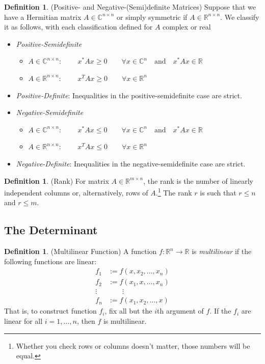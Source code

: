 \documentclass[12pt]{article}
\theoremstyle{plain}
\theoremstyle{definition}
\newtheorem{defn}[thm]{Definition}
\theoremstyle{remark}
\newcommand{\R}{\mathbb{R}}
\newcommand{\C}{\mathbb{C}}
\begin{document}
\begin{defn}{(Positive- and Negative-(Semi)definite Matrices)}
Suppose that we have a Hermitian matrix $A \in \C^{n\times n}$ or simply
symmetric if $A \in \R^{n\times n}$. We classify it as follows, with
each classification defined for $A$ complex or real
\begin{itemize}
  \item \emph{Positive-Semidefinite}
    \begin{itemize}
      \item $A \in \C^{n\times n}$:
          $\qquad x^* A x \geq 0
          \qquad \forall x\in \C^n
          \quad \text{and} \quad x^* A x\in \R$
      \item $A \in \R^{n\times n}$:
          $\qquad x^T A x\geq 0
          \qquad \forall x\in \R^n$
    \end{itemize}
  \item \emph{Positive-Definite}: Inequalities in the
    positive-semidefinite case are strict.
  \item \emph{Negative-Semidefinite}
    \begin{itemize}
      \item $A \in \C^{n\times n}$:
          $\qquad x^* A x \leq 0
          \qquad \forall x\in \C^n
          \quad \text{and} \quad x^* A x\in \R$
      \item $A \in \R^{n\times n}$:
          $\qquad x^T A x\leq 0
          \qquad \forall x\in \R^n$
    \end{itemize}
  \item \emph{Negative-Definite}: Inequalities in the
    negative-semidefinite case are strict.
\end{itemize}
\end{defn}

\begin{defn}{(Rank)}
For matrix $A\in \R^{m \times n}$, the rank is the number of linearly
independent columns or, alternatively, rows of $A$.\footnote{Whether you
check rows or columns doesn't matter, those numbers will be equal.} The
rank $r$ is such that $r \leq n$ and $r\leq m$.
\end{defn}

\subsection{The Determinant}

\begin{defn}{(Multilinear Function)}
A function $f:\R^n\rightarrow \R$ is \emph{multilinear} if the following
functions are linear:
\begin{align*}
  f_1 &:= f(x,x_2,\ldots,x_n)\\
  f_2 &:= f(x_1,x,\ldots,x_n)\\
  \vdots\; & \qquad \vdots\\
  f_n &:= f(x_1,x_2,\ldots,x)
\end{align*}
That is, to construct function $f_i$, fix all but the $i$th argument of
$f$. If the $f_i$ are linear for all $i = 1,\ldots, n$, then $f$ is
multilinear.
\end{defn}
\end{document}
